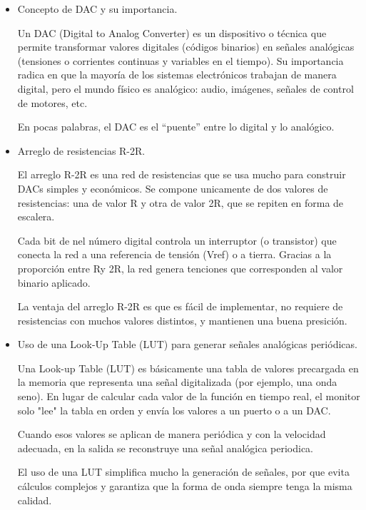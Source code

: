 \begin{itemize}
    \item Concepto de DAC y su importancia.\vspace{0.5em}
    
    Un DAC (Digital to Analog Converter) es un dispositivo o técnica que permite transformar valores digitales (códigos binarios) en señales analógicas (tensiones o corrientes continuas y variables en el tiempo). Su importancia radica en que la mayoría de los sistemas electrónicos trabajan de manera digital, pero el mundo físico es analógico: audio, imágenes, señales de control de motores, etc.
    
    En pocas palabras, el DAC es el “puente” entre lo digital y lo analógico.\vspace{1em}

    \item Arreglo de resistencias R-2R.\vspace{0.5em}

    El arreglo R-2R es una red de resistencias que se usa mucho para construir DACs simples y económicos. Se compone unicamente de dos valores de resistencias: una de valor R y otra de valor 2R, que se repiten en forma de escalera.
    
    Cada bit de nel número digital controla un interruptor (o transistor) que conecta la red a una referencia de tensión (Vref) o a tierra. Gracias a la proporción entre Ry 2R, la red genera tenciones que corresponden al valor binario aplicado.
    
    La ventaja del arreglo R-2R es que es fácil de implementar, no requiere de resistencias con muchos valores distintos, y mantienen una buena presición.\vspace{1em}
    
    \item Uso de una Look-Up Table (LUT) para generar señales analógicas periódicas.\vspace{0.5em}
    
    Una Look-up Table (LUT) es básicamente una tabla de valores precargada en la memoria que representa una señal digitalizada (por ejemplo, una onda seno). En lugar de calcular cada valor de la función en tiempo real, el monitor solo "lee" la tabla en orden y envía los valores a un puerto o a un DAC.
    
    Cuando esos valores se aplican de manera periódica y con la velocidad adecuada, en la salida se reconstruye una señal analógica periodica.
    
    El uso de una LUT simplifica mucho la generación de señales, por que evita cálculos complejos y garantiza que la forma de onda siempre tenga la misma calidad.\vspace{1em}
\end{itemize}


